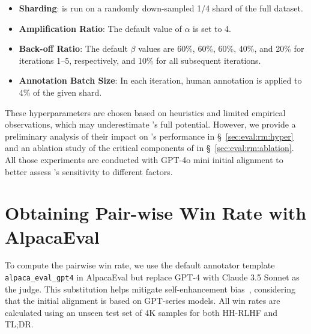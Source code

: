 \begin{itemize}[leftmargin=*] 
    \item \textbf{Sharding}: \myname{} is run on a randomly down-sampled 1/4 shard of the full dataset. 
    \item \textbf{Amplification Ratio}: The default value of $\alpha$ is set to 4. 
    \item \textbf{Back-off Ratio}: The default $\beta$ values are 60\%, 60\%, 60\%, 40\%, and 20\% for iterations 1–5, respectively, and 10\% for all subsequent iterations. 
    \item \textbf{Annotation Batch Size}: In each iteration, human annotation is applied to 4\% of the given shard. 
\end{itemize}

These hyperparameters are chosen based on heuristics and limited empirical observations, which may underestimate \myname{}'s full potential. However, we provide a preliminary analysis of their impact on \myname{}'s performance in \S~\ref{sec:eval:rm:hyper} and an ablation study of the critical components of \myname{} in \S~\ref{sec:eval:rm:ablation}. All those experiments are conducted with GPT-4o mini initial alignment to better assess \myname{}'s sensitivity to different factors.






\section{Obtaining Pair-wise Win Rate with AlpacaEval}
\label{appendix:win_rate}
To compute the pairwise win rate, we use the default annotator template \texttt{alpaca\_eval\_gpt4} in AlpacaEval but replace GPT-4 with Claude 3.5 Sonnet as the judge. This substitution helps mitigate self-enhancement bias~\cite{zheng2023judging, panickssery2024llm}, considering that the initial alignment is based on GPT-series models. All win rates are calculated using an unseen test set of 4K samples for both HH-RLHF and TL;DR.

